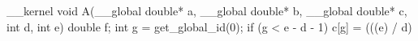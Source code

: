 __kernel void A(__global double* a, __global double* b, __global double* c, int d, int e) {
  double f;
  int g = get_global_id(0);
  if (g < e - d - 1) {
    c[g] = (((e) / d) %
  }
}